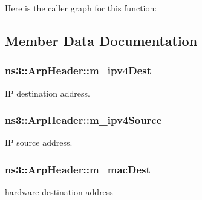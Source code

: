 Here is the caller graph for this function\+:




\subsection{Member Data Documentation}
\subsubsection[{\texorpdfstring{m\+\_\+ipv4\+Dest}{m_ipv4Dest}}]{ ns3\+::\+Arp\+Header\+::m\+\_\+ipv4\+Dest}\hypertarget{classns3_1_1ArpHeader_acaf790c20dd771889204740c70c7fdc0}{}\label{classns3_1_1ArpHeader_acaf790c20dd771889204740c70c7fdc0}


IP destination address. 

\subsubsection[{\texorpdfstring{m\+\_\+ipv4\+Source}{m_ipv4Source}}]{ ns3\+::\+Arp\+Header\+::m\+\_\+ipv4\+Source}\hypertarget{classns3_1_1ArpHeader_aedf1d03e058ebff6ffdbcbe01582e4a5}{}\label{classns3_1_1ArpHeader_aedf1d03e058ebff6ffdbcbe01582e4a5}


IP source address. 

\subsubsection[{\texorpdfstring{m\+\_\+mac\+Dest}{m_macDest}}]{ ns3\+::\+Arp\+Header\+::m\+\_\+mac\+Dest}\hypertarget{classns3_1_1ArpHeader_ab30b05ca3579eab9ec112456a5d8fed9}{}\label{classns3_1_1ArpHeader_ab30b05ca3579eab9ec112456a5d8fed9}


hardware destination address 

